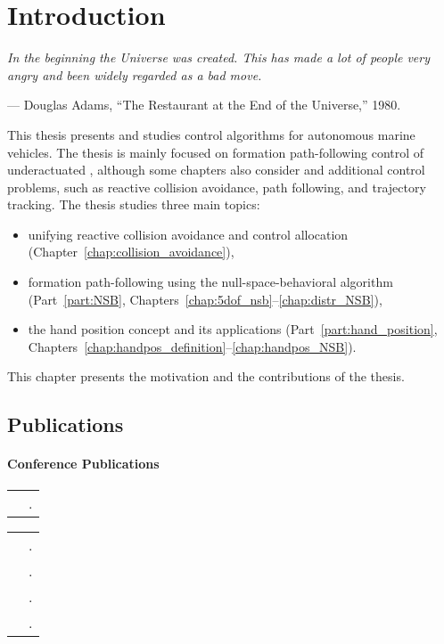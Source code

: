 \chapter{Introduction}
\label{chap:introduction}

\setlength{\epigraphwidth}{0.5\textwidth}
\epigraph{ \it
    In the beginning the Universe was created.
    This has made a lot of people very angry and been widely regarded as a bad move.
}{--- Douglas Adams, ``The Restaurant at the End of the Universe,'' 1980.}

This thesis presents and studies control algorithms for autonomous marine vehicles.
The thesis is mainly focused on formation path-following control of underactuated , although some chapters also consider  and additional control problems, such as reactive collision avoidance, path following, and trajectory tracking.
The thesis studies three main topics:
\begin{itemize}
    \item unifying reactive collision avoidance and control allocation (Chapter~\ref{chap:collision_avoidance}),
    \item formation path-following using the null-space-behavioral algorithm (Part~\ref{part:NSB}, Chapters~\ref{chap:5dof_nsb}--\ref{chap:distr_NSB}),
    \item the hand position concept and its applications (Part~\ref{part:hand_position}, Chapters~\ref{chap:handpos_definition}--\ref{chap:handpos_NSB}).
\end{itemize}
This chapter presents the motivation and the contributions of the thesis.





\vspace*{-0.25em}
\section{Publications}
\vspace*{-0.5em}
\newcommand{\tablecite}[1]{\cite{#1} & \fullcite{#1}.}

\subsubsection{Conference Publications}
\begin{tabularx}{\textwidth}{rX}
    \tablecite{matous_unifying_2021} 
\end{tabularx}
\begin{tabularx}{\textwidth}{rX}
    \tablecite{matouvs_formation_2022} \\
    \tablecite{matous_singularity_2023} \\
    \tablecite{matous_MPC_2022} \\
    \tablecite{restrepo_formation_2022}
\end{tabularx}


